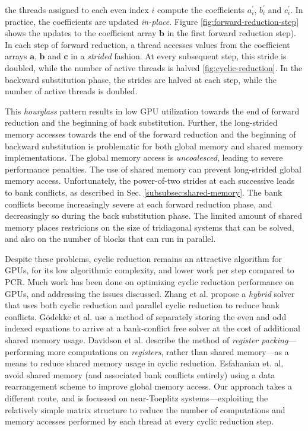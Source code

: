 the threads assigned to each even index $i$
compute the coefficients
$a_i^\prime$, $b_i^\prime$ and $c_i^\prime$.
In practice, the coefficients are updated \emph{in-place}.
Figure \ref{fig:forward-reduction-step} shows the updates
to the coefficient array $\bm{b}$
in the first forward reduction step).
In each step of forward reduction,
a thread accesses values from the coefficient arrays
$\bm{a}$, $\bm{b}$ and $\bm{c}$ in a \emph{strided} fashion.
At every subsequent step,
this stride is doubled, while the number of active threads is halved
\ref{fig:cyclic-reduction}.
In the backward substitution phase,
the strides are halved at each step,
while the number of active threads is doubled.

This \emph{hourglass} pattern results in low GPU utilization
towards the end of forward reduction
and the beginning of back substitution.
Further,
the long-strided memory accesses towards the end
of the forward reduction
and the beginning of backward substitution
is problematic for both
global memory and shared memory implementations.
The global memory access is \emph{uncoalesced},
leading to severe performance penalties.
The use of shared memory can prevent
long-strided global memory access.
Unfortunately,
the power-of-two strides at each successive
leads to bank conflicts,
as described in Sec. \ref{subsubsec:shared-memory}.
The bank conflicts become increasingly severe
at each forward reduction phase,
and decreasingly so during the back substitution phase.
The limited amount of shared memory places restricions
on the size of tridiagonal systems that can be solved,
and also on the number of blocks that can run in parallel.

Despite these problems,
cyclic reduction remains an attractive algorithm
for GPUs,
for its low algorithmic complexity,
and lower work per step compared to PCR.
Much work has been done on
optimizing cyclic reduction performance on GPUs,
and addressing the issues discussed.
Zhang et al. \cite{Zhang2010FTS} propose a
\emph{hybrid} solver
that uses both cyclic reduction and parallel cyclic reduction
to reduce bank conflicts.
G{\"o}dekke et al. \cite{GoSt11CR}
use a method of separately storing
the even and odd indexed equations
to arrive at a bank-conflict free solver
at the cost of additional shared memory usage.
Davidson et al. \cite{davidson2011register}
describe the method of
\emph{register packing}---performing more computations
on \emph{registers}, rather than shared memory---as
a means to reduce shared memory usage in cyclic reduction.
Esfahanian et. al, \cite{esfahanian2014efficient}
avoid shared memory (and associated bank conflicts entirely)
using a data rearrangement scheme to improve global memory access.
Our approach takes a different route,
and is focussed on near-Toeplitz systems---exploiting
the relatively simple matrix structure
to reduce the number of computations and memory accesses
performed by each thread
at every cyclic reduction step.

